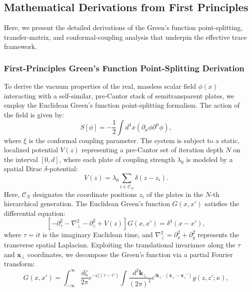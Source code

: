 \documentclass[12pt,letterpaper]{article}
\begin{document}
\subsection{Mathematical Derivations from First Principles}
Here, we present the detailed derivations of the Green's function point-splitting, transfer-matrix, and conformal-coupling analysis that underpin the effective trace framework.

\subsubsection{First-Principles Green's Function Point-Splitting Derivation}
To derive the vacuum properties of the real, massless scalar field $\phi(x)$ interacting with a self-similar, pre-Cantor stack of semitransparent plates, we employ the Euclidean Green's function point-splitting formalism. The action of the field is given by:
\begin{equation}
S[\phi] = -\frac{1}{2} \int d^4x \left( \partial_\mu \phi \partial^\mu \phi \right),
\label{eq:SI_action}
\end{equation}
where $\xi$ is the conformal coupling parameter. The system is subject to a static, localized potential $V(z)$ representing a pre-Cantor set of iteration depth $N$ on the interval $[0, d]$, where each plate of coupling strength $\lambda_0$ is modeled by a spatial Dirac $\delta$-potential:
\begin{equation}
V(z) = \lambda_0 \sum_{i \in \mathcal{C}_N} \delta(z - z_i).
\label{eq:SI_potential}
\end{equation}
Here, $\mathcal{C}_N$ designates the coordinate positions $z_i$ of the plates in the $N$-th hierarchical generation. The Euclidean Green's function $G(x, x')$ satisfies the differential equation:
\begin{equation}
\left[ -\partial_\tau^2 - \nabla_\perp^2 - \partial_z^2 + V(z) \right] G(x, x') = \delta^4(x - x'),
\label{eq:SI_euclidean_green}
\end{equation}
where $\tau = it$ is the imaginary Euclidean time, and $\nabla_\perp^2 = \partial_x^2 + \partial_y^2$ represents the transverse spatial Laplacian. Exploiting the translational invariance along the $\tau$ and $\mathbf{x}_\perp$ coordinates, we decompose the Green's function via a partial Fourier transform:
\begin{equation}
G(x, x') = \int_{-\infty}^{\infty} \frac{d\zeta}{2\pi} e^{-i\zeta(\tau - \tau')} \int \frac{d^2\mathbf{k}_\perp}{(2\pi)^2} e^{i\mathbf{k}_\perp \cdot (\mathbf{x}_\perp - \mathbf{x}_\perp')} g(z, z'; \kappa),
\label{eq:SI_fourier}
\end{equation}
\end{document}
